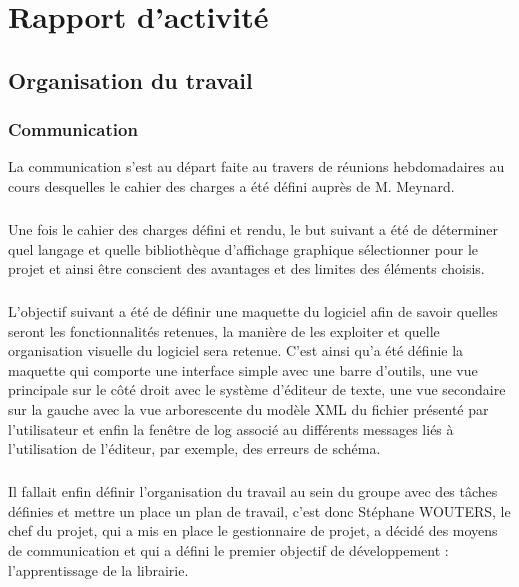\chapter{Rapport d'activité}

\section{Organisation du travail}
        
\subsection{Communication}

La communication s'est au départ faite au travers de réunions hebdomadaires au cours desquelles le cahier des charges a été défini auprès de M. Meynard.
\paragraph{}
       
Une fois le cahier des charges défini et rendu, le but suivant a été de déterminer quel langage et quelle bibliothèque d'affichage graphique sélectionner pour le projet et ainsi être conscient des avantages et des limites des éléments choisis.
\paragraph{}

L'objectif suivant a été de définir une maquette du logiciel afin de savoir quelles seront les fonctionnalités retenues, la manière de les exploiter et quelle organisation visuelle du logiciel sera retenue. C'est ainsi qu'a été définie la maquette qui comporte une interface simple avec une barre d'outils, une vue principale sur le côté droit avec le système d'éditeur de texte, une vue secondaire sur la gauche avec la vue arborescente du modèle XML du fichier présenté par l'utilisateur et enfin la fenêtre de log associé au différents messages liés à l'utilisation de l'éditeur, par exemple, des erreurs de schéma.
\paragraph{}

Il fallait enfin définir l'organisation du travail au sein du groupe avec des tâches définies et mettre un place un plan de travail, c'est donc Stéphane WOUTERS, le chef du projet, qui a mis en place le gestionnaire de projet, a décidé des moyens de communication et qui a défini le premier objectif de développement : l'apprentissage de la librairie.
